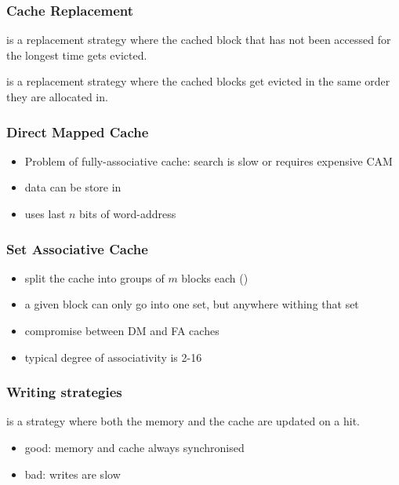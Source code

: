 \documentclass{article}
\begin{document}
\subsubsection{Cache Replacement}

\begin{definition}
	 is a replacement strategy where the cached block that has not been accessed
	for the longest time gets evicted.
\end{definition}
\begin{definition}
	 is a replacement strategy where the cached blocks get evicted in the same order they are 
	allocated in.
\end{definition}

\subsubsection{Direct Mapped Cache}

\begin{itemize}
	\item Problem of fully-associative cache: search is slow or requires expensive CAM
	\item data can be store in 
	\item uses last $n$ bits of word-address
\end{itemize}

\subsubsection{Set Associative Cache}

\begin{itemize}
	\item split the cache into groups of $m$ blocks each ()
	\item a given block can only go into one set, but anywhere withing that set 
	\item compromise between DM and FA caches
	\item typical degree of associativity is 2-16
\end{itemize}

\subsubsection{Writing strategies}

\begin{definition}
	 is a strategy where both the memory and the cache
	are updated on a hit.
	\begin{itemize}
		\item good: memory and cache always synchronised
		\item bad: writes are slow
	\end{itemize}
\end{definition}
\end{document}
